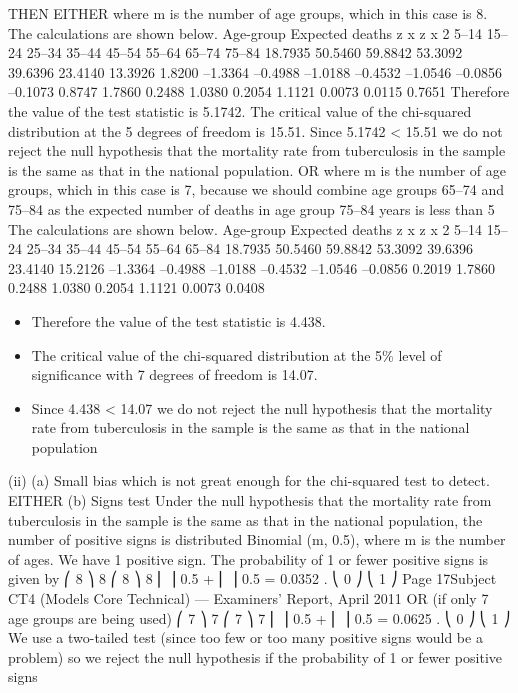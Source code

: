 \documentclass[a4paper,12pt]{article}
\begin{document}
\begin{enumerate}
THEN EITHER
where m is the number of age groups, which in this case is 8.
The calculations are shown below.
Age-group Expected deaths z x z x 2
5–14
15–24
25–34
35–44
45–54
55–64
65–74
75–84 18.7935
50.5460
59.8842
53.3092
39.6396
23.4140
13.3926
1.8200 –1.3364
–0.4988
–1.0188
–0.4532
–1.0546
–0.0856
–0.1073
0.8747 1.7860
0.2488
1.0380
0.2054
1.1121
0.0073
0.0115
0.7651
Therefore the value of the test statistic is 5.1742.
The critical value of the chi-squared distribution at the 5%
degrees of freedom is 15.51.
Since 5.1742 < 15.51 we do not reject the null hypothesis that the mortality rate from tuberculosis in the sample is the same as that in the national population.
OR
where m is the number of age groups, which in this case is 7, because we should combine age groups 65–74 and 75–84 as the expected number of deaths in age group 75–84 years is less than 5
The calculations are shown below.
Age-group Expected deaths z x z x 2
5–14
15–24
25–34
35–44
45–54
55–64
65–84 18.7935
50.5460
59.8842
53.3092
39.6396
23.4140
15.2126 –1.3364
–0.4988
–1.0188
–0.4532
–1.0546
–0.0856
0.2019 1.7860
0.2488
1.0380
0.2054
1.1121
0.0073
0.0408
\begin{itemize}
\item Therefore the value of the test statistic is 4.438.
\item The critical value of the chi-squared distribution at the 5\% level of significance with 7
degrees of freedom is 14.07.
\item Since 4.438 < 14.07 we do not reject the null hypothesis that the mortality rate from tuberculosis in the sample is the same as that in the national population
\end{itemize}
(ii)
(a)
Small bias which is not great enough for the chi-squared test to detect.
EITHER
(b)
Signs test
Under the null hypothesis that the mortality rate from tuberculosis in the sample is the same as that in the national population,
the number of positive signs is distributed Binomial (m, 0.5), where m is the number of ages.
We have 1 positive sign.
The probability of 1 or fewer positive signs is given by
⎛ 8 ⎞ 8 ⎛ 8 ⎞ 8
⎜ ⎟ 0.5 + ⎜ ⎟ 0.5 = 0.0352 .
⎝ 0 ⎠
⎝ 1 ⎠
Page 17Subject CT4 (Models Core Technical) — Examiners’ Report, April 2011
OR (if only 7 age groups are being used)
⎛ 7 ⎞ 7 ⎛ 7 ⎞ 7
⎜ ⎟ 0.5 + ⎜ ⎟ 0.5 = 0.0625 .
⎝ 0 ⎠
⎝ 1 ⎠
We use a two-tailed test (since too few or too many positive signs would be a
problem)
so we reject the null hypothesis if the probability of 1 or fewer positive signs

\end{enumerate}
\end{document}
